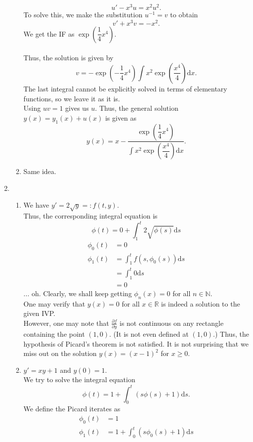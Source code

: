 \documentclass{article}
\begin{document}
\begin{enumerate}[label = Q.\arabic*.]
\begin{enumerate}[label = (\roman*)]
		\[u' - x^3u = x^2u^2.\]
		To solve this, we make the substitution $u^{-1} = v$ to obtain
		\[v' + x^3v = -x^2.\]
		We get the IF as $\exp\left(\dfrac{1}{4}x^4\right).$\\~\\
		Thus, the solution is given by
		\[v = -\exp\left(-\dfrac{1}{4}x^4\right)\int x^2\exp\left(\dfrac{x^4}{4}\right) \text{d}x.\]
		The last integral cannot be explicitly solved in terms of elementary functions, so we leave it as it is.\\
		Using $uv = 1$ gives us $u.$ Thus, the general solution $y(x) = y_1(x) + u(x)$ is given as
		\[y(x) = x - \dfrac{\exp\left(\dfrac{1}{4}x^4\right)}{\displaystyle\int x^2\exp\left(\dfrac{x^4}{4}\right) \text{d}x}.\]
		\item Same idea.
	\end{enumerate}
	\item 
	\begin{enumerate}[label = (\roman*)] 
		\item We have $y' = 2\sqrt{y} =: f(t, y).$\\
		Thus, the corresponding integral equation is
		\[\phi(t) = 0 + \int_{1}^{t} 2\sqrt{\phi(s)} \text{d}s\]
		\begin{align*} 
			\phi_0(t) &= 0\\
			\phi_1(t) &= \int_{1}^{t} f(s, \phi_0(s)) \text{d}s\\
			&= \int_{1}^{t} 0 \text{d}s\\
			&= 0
		\end{align*}
		... oh. Clearly, we shall keep getting $\phi_n(x) = 0$ for all $n \in \mathbb{N}.$\\
		One may verify that $y(x) = 0$ for all $x \in \mathbb{R}$ is indeed a solution to the given IVP.\\
		However, one may note that $\frac{\partial f}{\partial y}$ is not continuous on any rectangle containing the point $(1, 0).$ (It is not even defined at $(1, 0)$.) Thus, the hypothesis of Picard's theorem is not satisfied. It is not surprising that we miss out on the solution $y(x) = (x - 1)^2$ for $x \ge 0.$
		\item $y' = xy + 1$ and $y(0) = 1.$\\
		We try to solve the integral equation
		\[\phi(t) = 1 + \int_{0}^{t} (s\phi(s) + 1) \text{d}s.\]
		We define the Picard iterates as
		\begin{align*} 
			\phi_0(t) &= 1\\
			\phi_1(t) &= 1 + \int_{0}^{t} (s\phi_0(s) + 1) \text{d}s\\

\end{align*}
\end{enumerate}
\end{enumerate}
\end{document}
